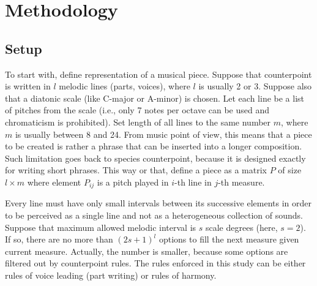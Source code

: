 \documentclass{article}
\begin{document}
\section{Methodology}
\label{sec:methodology}

\subsection{Setup}
\label{subsec:setup}

To start with, define representation of a musical piece. Suppose that counterpoint is written in $l$ melodic lines (parts, voices), where $l$ is usually 2 or 3. Suppose also that a diatonic scale (like C-major or A-minor) is chosen. Let each line be a list of pitches from the scale (i.e., only 7 notes per octave can be used and chromaticism is prohibited). Set length of all lines to the same number $m$, where $m$ is usually between 8 and 24. From music point of view, this means that a piece to be created is rather a phrase that can be inserted into a longer composition. Such limitation goes back to species counterpoint, because it is designed exactly for writing short phrases. This way or that, define a piece as a matrix $P$ of size $l \times m$ where element $P_{ij}$ is a pitch played in $i$-th line in $j$-th measure.

Every line must have only small intervals between its successive elements in order to be perceived as a single line and not as a heterogeneous collection of sounds. Suppose that maximum allowed melodic interval is $s$ scale degrees (here, $s = 2$). If so, there are no more than $(2s + 1)^l$ options to fill the next measure given current measure. Actually, the number is smaller, because some options are filtered out by counterpoint rules. The rules enforced in this study can be either rules of voice leading (part writing) or rules of harmony.
\end{document}
